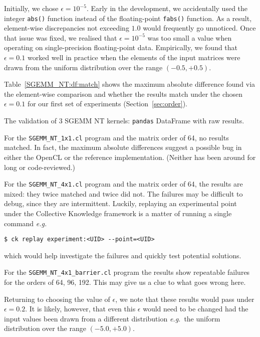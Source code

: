 \documentclass{acm_proc_article-sp} %
\begin{document}
Initially, we chose $\epsilon = 10^{-5}$.
%
Early in the development, we accidentally used the integer \verb|abs()|
function instead of the floating-point \verb|fabs()| function.
%
As a result, element-wise discrepancies not exceeding $1.0$ would frequently go
unnoticed.
%
Once that issue was fixed, we realised that $\epsilon = 10^{-5}$ was too small
a value when operating on single-precision floating-point data.
%
Empirically, we found that $\epsilon = 0.1$ worked well in practice when the
elements of the input matrices were drawn from the uniform distribution over
the range $(-0.5, +0.5)$.
%

Table~\ref{SGEMM_NT:df:match} shows the maximum absolute difference found via
the element-wise comparison and whether the results match under the chosen
$\epsilon = 0.1$ for our first set of experiments (Section~\ref{sec:order}).

\begin{sidewaystable*}
  \centering
  \caption{\label{SGEMM_NT:df:match}The validation of 3 SGEMM NT kernels: {\tt pandas} DataFrame with raw results.}
  
\end{sidewaystable*}

For the \verb|SGEMM_NT_1x1.cl| program and the matrix order of 64, no results
matched.
%
In fact, the maximum absolute differences suggest a possible bug in either the
OpenCL or the reference implementation. (Neither has been around for long or
code-reviewed.)

For the \verb|SGEMM_NT_4x1.cl| program and the matrix order of 64, the results
are mixed: they twice matched and twice did not.
%
The failures may be difficult to debug, since they are intermittent.
%
Luckily, replaying an experimental point under the Collective Knowledge framework is
a matter of running a single command {\em e.g.}\:
%
\begin{verbatim}
$ ck replay experiment:<UID> --point=<UID>
\end{verbatim}
%
which would help investigate the failures and quickly test potential solutions.

For the \verb|SGEMM_NT_4x1_barrier.cl| program the results show repeatable
failures for the orders of 64, 96, 192.
%
This may give us a clue to what goes wrong here.

Returning to choosing the value of $\epsilon$, we note that these results would pass
under $\epsilon = 0.2$.
%
It is likely, however, that even this $\epsilon$ would need to be changed had
the input values been drawn from a different distribution {\em e.g.}\ the
uniform distribution over the range $(-5.0, +5.0)$.
\end{document}

